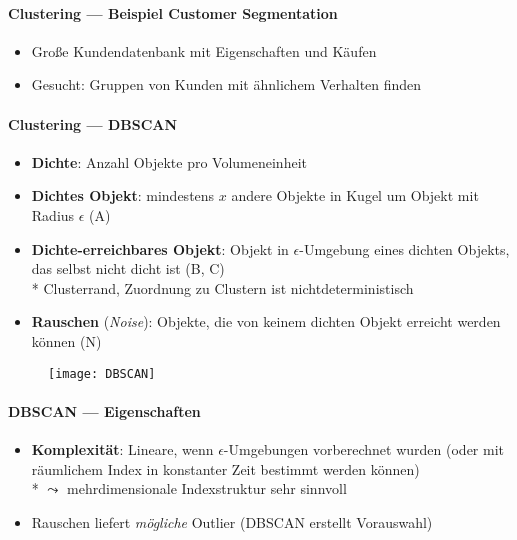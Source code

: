 \paragraph{Clustering --- Beispiel Customer Segmentation}
\begin{itemize}
	\item Große Kundendatenbank mit Eigenschaften und Käufen
	\item Gesucht: Gruppen von Kunden mit ähnlichem Verhalten finden
\end{itemize}

\paragraph{Clustering --- DBSCAN}
\begin{itemize}
	\item \textbf{Dichte}: Anzahl Objekte pro Volumeneinheit
	\item \textbf{Dichtes Objekt}: mindestens \( x \) andere Objekte in Kugel um Objekt mit Radius \( \epsilon \) (A)
	\item \textbf{Dichte-erreichbares Objekt}: Objekt in \( \epsilon \)-Umgebung eines dichten Objekts, das selbst nicht dicht ist (B, C) \\*
		Clusterrand, Zuordnung zu Clustern ist nichtdeterministisch
	\item \textbf{Rauschen} (\emph{Noise}): Objekte, die von keinem dichten Objekt erreicht werden können (N)
\end{itemize}
\begin{figure}[H]\centering\label{DBSCAN}\texttt{[image: DBSCAN]}\end{figure}

\paragraph{DBSCAN --- Eigenschaften}
\begin{itemize}
	\item \textbf{Komplexität}: Lineare, wenn \( \epsilon \)-Umgebungen vorberechnet wurden (oder mit räumlichem Index in konstanter Zeit bestimmt werden können) \\* \( \leadsto \) mehrdimensionale Indexstruktur sehr sinnvoll
	\item Rauschen liefert \emph{mögliche} Outlier (DBSCAN erstellt Vorauswahl)
\end{itemize}

